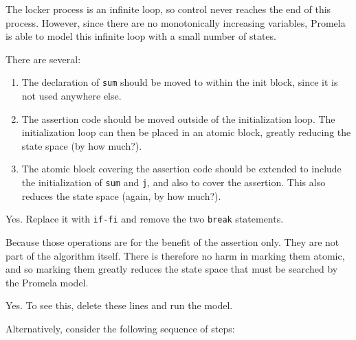 
The locker process is an infinite loop, so control
never reaches the end of this process.
However, since there are no monotonically increasing variables,
Promela is able to model this infinite loop with a small
number of states.


There are several:
\begin{enumerate}
\item	The declaration of {\tt sum} should be moved to within
	the init block, since it is not used anywhere else.
\item	The assertion code should be moved outside of the
	initialization loop.  The initialization loop can
	then be placed in an atomic block, greatly reducing
	the state space (by how much?).
\item	The atomic block covering the assertion code should
	be extended to include the initialization of {\tt sum}
	and {\tt j}, and also to cover the assertion.
	This also reduces the state space (again, by how
	much?).
\end{enumerate}


Yes.  Replace it with {\tt if-fi} and remove the two {\tt break} statements.


Because those operations are for the benefit of the
assertion only.  They are not part of the algorithm itself.
There is therefore no harm in marking them atomic, and
so marking them greatly reduces the state space that must
be searched by the Promela model.


Yes.  To see this, delete these lines and run the model.

Alternatively, consider the following sequence of steps:

